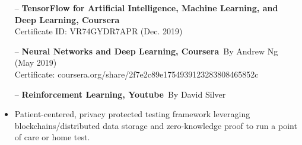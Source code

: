 





\dotfill


\dotfill



\begin{itemize}
    \item[--] \textbf{TensorFlow for Artificial
Intelligence, Machine Learning, and Deep
Learning, Coursera} \\Certificate ID: VR74GYDR7APR (Dec. 2019)
    \item[--] \textbf{Neural Networks and Deep Learning, Coursera} \,By Andrew Ng (May 2019)\\Certificate: coursera.org/share/2f7e2c89e1754939123283808465852c
    \item[--] \textbf{Reinforcement Learning, Youtube} \,By David Silver
\end{itemize}




\begin{itemize}
\item Patient-centered, privacy protected testing framework leveraging blockchains/distributed data storage and zero-knowledge proof to run a point of care or home test.
\end{itemize}


